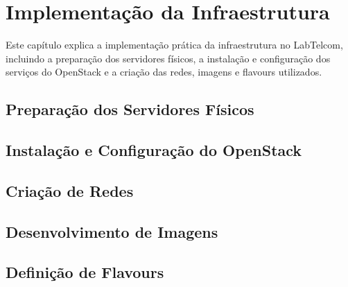 \chapter{Implementação da Infraestrutura}

Este capítulo explica a implementação prática da infraestrutura no LabTelcom, incluindo a preparação dos servidores físicos, a instalação e configuração dos serviços do OpenStack e a criação das redes, imagens e flavours utilizados.

\section{Preparação dos Servidores Físicos}

\section{Instalação e Configuração do OpenStack}

\section{Criação de Redes}

\section{Desenvolvimento de Imagens}

\section{Definição de Flavours}
